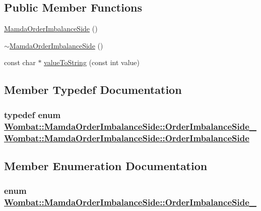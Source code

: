 \subsection*{Public Member Functions}
\begin{CompactItemize}
\item 
\hyperlink{classWombat_1_1MamdaOrderImbalanceSide_dd6ee1eaccc29e04638a3e010de61fd5}{Mamda\-Order\-Imbalance\-Side} ()
\item 
\hyperlink{classWombat_1_1MamdaOrderImbalanceSide_9576c1da63bf97ca79f3d2ab616d669a}{$\sim$Mamda\-Order\-Imbalance\-Side} ()
\item 
const char $\ast$ \hyperlink{classWombat_1_1MamdaOrderImbalanceSide_106cdb74bfd59fbbc213d82c4b1181e8}{value\-To\-String} (const int value)
\end{CompactItemize}


\subsection{Member Typedef Documentation}
\hypertarget{classWombat_1_1MamdaOrderImbalanceSide_835b164f1c50ae9416b3567deb24d5c2}{
\subsubsection[OrderImbalanceSide]{\setlength{\rightskip}{0pt plus 5cm}typedef enum \hyperlink{classWombat_1_1MamdaOrderImbalanceSide_dc7dcca85ab876bdefbcbb584ca38860}{Wombat::Mamda\-Order\-Imbalance\-Side::Order\-Imbalance\-Side\_\-}  \hyperlink{classWombat_1_1MamdaOrderImbalanceSide_835b164f1c50ae9416b3567deb24d5c2}{Wombat::Mamda\-Order\-Imbalance\-Side::Order\-Imbalance\-Side}}}
\label{classWombat_1_1MamdaOrderImbalanceSide_835b164f1c50ae9416b3567deb24d5c2}




\subsection{Member Enumeration Documentation}
\hypertarget{classWombat_1_1MamdaOrderImbalanceSide_dc7dcca85ab876bdefbcbb584ca38860}{
\subsubsection[OrderImbalanceSide\_\-]{\setlength{\rightskip}{0pt plus 5cm}enum \hyperlink{classWombat_1_1MamdaOrderImbalanceSide_dc7dcca85ab876bdefbcbb584ca38860}{Wombat::Mamda\-Order\-Imbalance\-Side::Order\-Imbalance\-Side\_\-}}}
\label{classWombat_1_1MamdaOrderImbalanceSide_dc7dcca85ab876bdefbcbb584ca38860}


